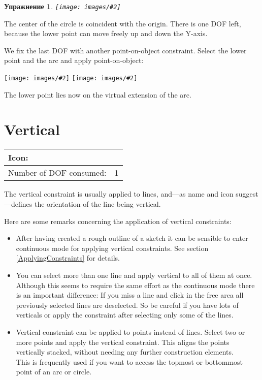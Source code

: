\documentclass[12pt,titlepage]{article}
\newcommand{\icon}[1]{\raisebox{-1em}{\rule{0pt}{27pt}\texttt{[image: images/\#1]}}}
\newcommand{\img}[2]{\vspace{2ex}\noindent\texttt{[image: images/\#2]}}
\newcommand{\dofConsumed}{Number of DOF consumed:}
\newtheorem{Exercise}{Упражнение}
\begin{document}
\begin {itemize}
\begin{Exercise}
\img{}{PointOnLine1}
\end{Exercise}

The center of the circle is coincident with the origin. There is one DOF left,
because the lower point can move freely up and down the Y-axis.

We fix the last DOF with another point-on-object constraint. Select the lower point
and the arc and apply point-on-object:

\img{height=5cm}{PointOnLine2}
\hspace{1cm}
\raisebox{2cm}{$\stackrel{\icon{Constraint_PointOnObject}}{\longrightarrow}$}
\hspace{1cm}
\img{height=5cm}{PointOnLine3}

The lower point lies now on the virtual extension of the arc.


\section{Vertical}
\label{Vertical}
\begin{tabular}{|l|l|}
\hline
Icon: & \icon{Constraint_Vertical}\\
\hline
\dofConsumed & 1 \\
\hline
\end{tabular}

The vertical constraint is usually applied to lines, and---as name and icon
suggest---defines the orientation of the line being vertical.

Here are some remarks concerning the application of vertical constraints:

\begin{itemize}
\item After having created a rough outline of a sketch it can be sensible to enter
      continuous mode for applying vertical constraints. See section
      \vref{ApplyingConstraints} for details.
\item You can select more than one line and apply vertical to all of them at once.
      Although this seems to require the same effort as the continuous mode there is
      an important difference: If you miss a line and click in the free area all
      previously selected lines are deselected. So be careful if you have lots of
      verticals or apply the constraint after selecting only some of the lines.
\item Vertical constraint can be applied to points instead of lines. Select two or
      more points and apply the vertical constraint. This aligns the points
      vertically stacked, without needing any further construction elements.\\      
      This is frequently used if you want to access the topmost or bottommost point
      of an arc or circle.
      

\end{itemize}
\end{itemize}
\end{document}
